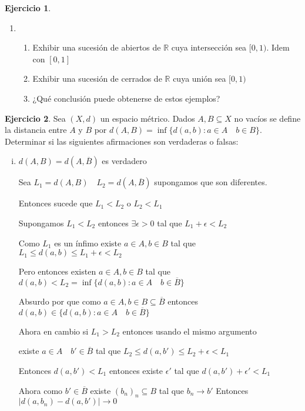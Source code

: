 \documentclass[12pt]{report}
\newcommand{\R}{\mathbb{R}}
\newcommand{\ra}{\rightarrow}
\newcommand{\ol}{\overline}
\theoremstyle{definition}
\newtheorem{ej}{Ejercicio}
\begin{document}
\begin{ej}
\begin{enumerate}
\begin{proof}
El absurdo provino de suponer que $y \in X \setminus G$ por lo tanto $y \in G$
\end{proof}
  \item 
    \begin{enumerate}
      \item Exhibir una sucesión de abiertos de $\R$ cuya intersección sea $[0,1)$. Idem con $[0,1]$
      \item Exhibir una sucesión de cerrados de $\R$ cuya unión sea $[0,1)$
      \item ¿Qué conclusión puede obtenerse de estos ejemplos? 
    \end{enumerate}
\end{enumerate}
\end{ej}

\begin{ej}
  Sea $(X,d)$ un espacio métrico. Dados $A,B \subseteq X$ no vacíos se define la distancia entre $A$ y $B$ por $d(A,B) = \inf{\{d(a,b): a\in A \quad b \in B\}}$. Determinar si las siguientes afirmaciones son verdaderas o falsas:
  \begin{enumerate}[i)]
        \item $d(A,B) = d(A ,\ol  B)$ es verdadero

      Sea $L_1 = d(A,B) \quad L_2 = d( A ,\ol B)$ supongamos que son diferentes. 

      Entonces sucede que $L_1 < L_2$ o $L_2 < L_1$

      Supongamos $L_1 < L_2$ entonces $\exists \epsilon > 0$ tal que $L_1 + \epsilon < L_2$

      Como $L_1$ es un ínfimo existe $a \in A, b \in B$ tal que $L_1 \leq d(a,b) \leq L_1 + \epsilon <  L_2 $

      Pero entonces existen $a \in A , b \in B$ tal que  $d(a,b) <  L_2  = \inf{\{d(a,b): a\in A \quad b \in \ol B\}}$

      Absurdo por que como $a \in A, b\in B\subseteq \ol B$ entonces $d(a,b) \in \{d(a,b): a\in A \quad b \in \ol B\}$

      Ahora en cambio si $L_1 > L_2$ entonces usando el mismo argumento

    existe $a \in A \quad b' \in \ol B$ tal que $L_2 \leq d(a,b') \leq L_2 + \epsilon <  L_1$

    Entonces $d(a,b') < L_1$ entonces existe $\epsilon '$ tal que $d(a,b') + \epsilon ' < L_1$

  Ahora como $b' \in \ol B$ existe $(b_n )_n \subseteq B$ tal que $b_n \ra b'$ Entonces $|d(a,b_n) - d(a,b')| \ra 0$ 


\end{enumerate}
\end{ej}
\end{document}
